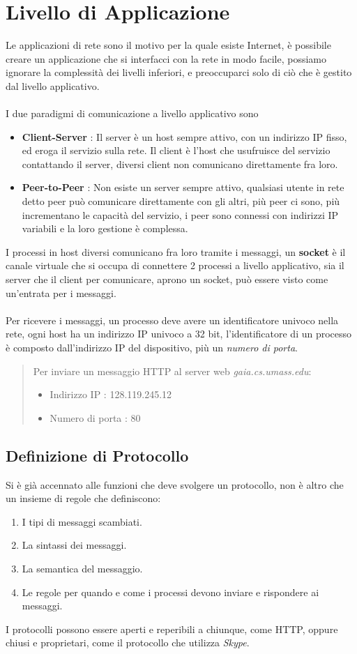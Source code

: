 \documentclass[12pt, letterpaper]{article}
\newcommand{\acc}{\\\hphantom{}\\}
\begin{document}
 \section{Livello di Applicazione}
 Le applicazioni di rete sono il motivo per la quale esiste Internet, è possibile creare un applicazione
che si interfacci con la rete in modo facile, possiamo ignorare la complessità dei livelli inferiori, 
e preoccuparci solo di ciò che è gestito dal livello applicativo.\acc
I due paradigmi di comunicazione a livello applicativo sono \begin{itemize}
    \item \textbf{Client-Server} : Il server è un host sempre attivo, con un indirizzo IP fisso, ed eroga il 
    servizio sulla rete. Il client è l'host che usufruisce del servizio contattando il server, diversi client 
    non comunicano direttamente fra loro.
    \item \textbf{Peer-to-Peer} : Non esiste un server sempre attivo, qualsiasi utente in rete detto peer può 
    comunicare direttamente con gli altri, più peer ci sono, più incrementano le capacità del servizio, i 
    peer sono connessi con indirizzi IP variabili e la loro gestione è complessa.
\end{itemize}
I processi in host diversi comunicano fra loro tramite i messaggi, un \textbf{socket} è il canale 
virtuale che si occupa di connettere 2 processi a livello applicativo, sia il server che il client per 
comunicare, aprono un socket, può essere visto come un'entrata per i messaggi.\acc 
Per ricevere i messaggi, un processo deve avere un identificatore univoco nella rete, ogni host ha un 
indirizzo IP univoco a 32 bit, l'identificatore di un processo è composto dall'indirizzo IP 
del dispositivo, più un \textit{numero di porta}.\begin{quote}
    Per inviare un messaggio HTTP al server web \textit{gaia.cs.umass.edu}:\begin{itemize}
        \item Indirizzo IP : 128.119.245.12
        \item Numero di porta : 80
    \end{itemize}
\end{quote}
\subsection{Definizione di Protocollo}
Si è già accennato alle funzioni che deve svolgere un protocollo, non è altro che un insieme di regole 
che definiscono:\begin{enumerate}
    \item I tipi di messaggi scambiati. 
    \item La sintassi dei messaggi. 
    \item La semantica del messaggio. 
    \item Le regole per quando e come i processi devono inviare e rispondere ai messaggi.
\end{enumerate}
I protocolli possono essere aperti e reperibili a chiunque, come HTTP, oppure chiusi e proprietari, come 
il protocollo che utilizza \textit{Skype}.
\end{document}
